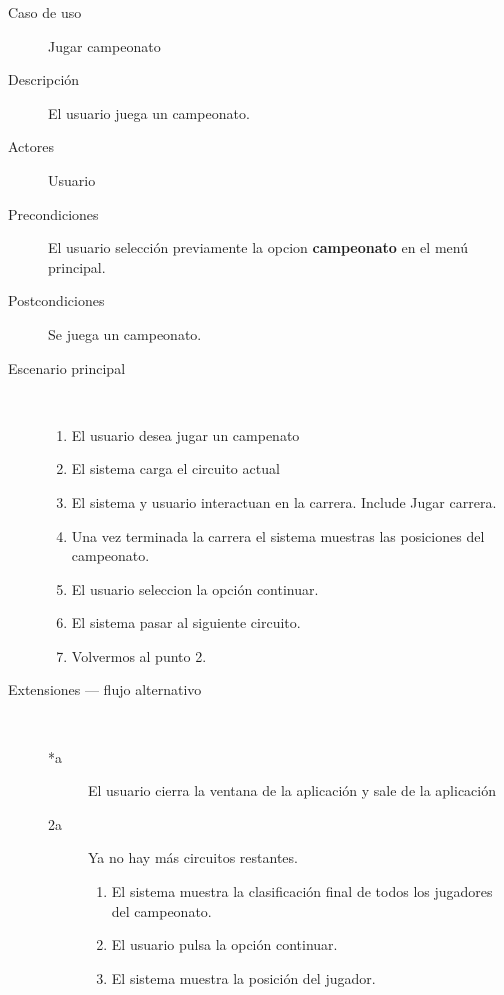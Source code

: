 \begin{description}
    \item[Caso de uso] Jugar campeonato
    \item[Descripción] El usuario juega un campeonato.
    \item[Actores] Usuario
    \item[Precondiciones] El usuario selección previamente la opcion \textbf{campeonato} en el menú principal.
    \item[Postcondiciones] Se juega un campeonato.
    
    \item[Escenario principal] $\quad$
        \begin{enumerate}
            \item El usuario desea jugar un campenato
            \item El sistema carga el circuito actual
            \item El sistema y usuario interactuan en la carrera. Include Jugar carrera.
            \item Una vez terminada la carrera el sistema muestras las posiciones del campeonato.
            \item El usuario seleccion la opción continuar.
            \item El sistema pasar al siguiente circuito.
            \item Volvermos al punto 2.
        \end{enumerate}
    \item[Extensiones --- flujo alternativo] $\quad$
        \begin{description}
            \item[*a ] El usuario cierra la ventana de la aplicación y sale de la aplicación
            
            \item[2a ] Ya no hay más circuitos restantes.
                \begin{enumerate}
                    \item El sistema muestra la clasificación final de todos los jugadores del campeonato.
                    \item El usuario pulsa la opción continuar.
                    \item El sistema muestra la posición del jugador.
                \end{enumerate}
        \end{description}
\end{description}

